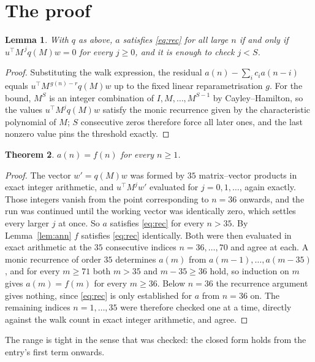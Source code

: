 \documentclass[11pt,a4paper]{article}
\theoremstyle{plain}
\newtheorem{theorem}{Theorem}
\newtheorem{lemma}[theorem]{Lemma}
\theoremstyle{definition}
\begin{document}
\section{The proof}

\begin{lemma}\label{lem:crit}
With $q$ as above, $a$ satisfies \eqref{eq:rec} for all large $n$ if and only if
$u^{\!\top}M^{\,j}q(M)w=0$ for every $j\ge0$, and it is enough to check $j<S$.
\end{lemma}

\begin{proof}
Substituting the walk expression, the residual $a(n)-\sum_ic_ia(n-i)$ equals
$u^{\!\top}M^{\,g(n)-r}q(M)w$ up to the fixed linear reparametrisation $g$. For the bound,
$M^{S}$ is an integer combination of $I,M,\dots,M^{S-1}$ by Cayley--Hamilton, so the values
$u^{\!\top}M^{j}q(M)w$ satisfy the monic recurrence given by the characteristic polynomial of
$M$; $S$ consecutive zeros therefore force all later ones, and the last nonzero value pins the
threshold exactly.
\end{proof}

\begin{theorem}
$a(n)=f(n)$ for every $n\ge1$.
\end{theorem}

\begin{proof}
The vector $w'=q(M)w$ was formed by $35$ matrix--vector products in exact integer
arithmetic, and $u^{\!\top}M^{j}w'$ evaluated for $j=0,1,\dots$, again exactly. Those integers
vanish from the point corresponding to $n=36$ onwards, and the run was continued until the
working vector was identically zero, which settles every larger $j$ at once. So $a$ satisfies
\eqref{eq:rec} for every $n>35$. By Lemma~\ref{lem:ann} $f$ satisfies \eqref{eq:rec}
identically. Both were then evaluated in exact arithmetic at the $35$ consecutive indices
$n=36,\dots,70$ and agree at each. A monic recurrence of order $35$
determines $a(m)$ from $a(m-1),\dots,a(m-35)$, and for every $m\ge71$ both
$m>35$ and $m-35\ge36$ hold, so induction on $m$ gives $a(m)=f(m)$ for every
$m\ge36$.
Below $n=36$ the recurrence argument gives nothing, since \eqref{eq:rec} is only
established for $a$ from $n=36$ on. The remaining indices $n=1,\dots,35$ were
therefore checked one at a time, directly against the walk count in exact integer arithmetic,
and agree.
\end{proof}

The range is tight in the sense that was checked: the closed form holds from the entry's first term onwards.
\end{document}
